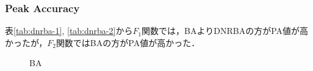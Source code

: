 \documentclass[a4j,11pt]{jarticle}
\begin{document}
\subsubsection{Peak Accuracy}
表\ref{tab:dnrba-1}, \ref{tab:dnrba-2}から$F_1$関数では，BAよりDNRBAの方がPA値が高かったが，$F_2$関数ではBAの方がPA値が高かった．

\begin{figure}[h]
\centering
{}

\caption{BA}
\label{fig:dnrba-results_ba}
\end{figure}
\end{document}
